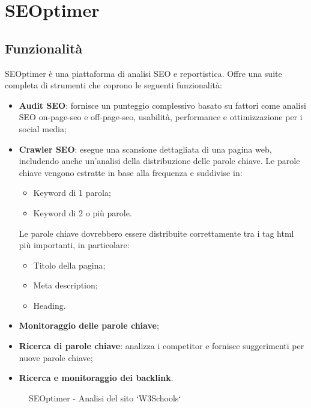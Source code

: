 \section{SEOptimer}

\subsection{Funzionalità}
\par SEOptimer è una piattaforma di analisi SEO e reportistica. Offre una suite completa di strumenti che coprono le seguenti funzionalità:
\begin{itemize}
    \item \textbf{Audit SEO}: fornisce un punteggio complessivo basato su fattori come analisi SEO \gls{on-page-seo} e \gls{off-page-seo}, usabilità, performance e ottimizzazione per i social media;
    \item \textbf{Crawler SEO}: esegue una scansione dettagliata di una pagina web, includendo anche un'analisi della distribuzione delle parole chiave. Le parole chiave vengono estratte in base alla frequenza e suddivise in:
    \begin{itemize}
        \item Keyword di 1 parola;
        \item Keyword di 2 o più parole.
    \end{itemize}
    Le parole chiave dovrebbero essere distribuite correttamente tra i tag \gls{html} più importanti, in particolare: 
    \begin{itemize}
        \item Titolo della pagina;
        \item Meta description;
        \item Heading.
    \end{itemize}
    \item \textbf{Monitoraggio delle parole chiave};
    \item \textbf{Ricerca di parole chiave}: analizza i competitor e fornisce suggerimenti per nuove parole chiave;
    \item \textbf{Ricerca e monitoraggio dei \gls{backlink}}.
\end{itemize}

\begin{figure}[H]
    \centering 
    \caption{SEOptimer - Analisi del sito `W3Schools`}
\end{figure}

